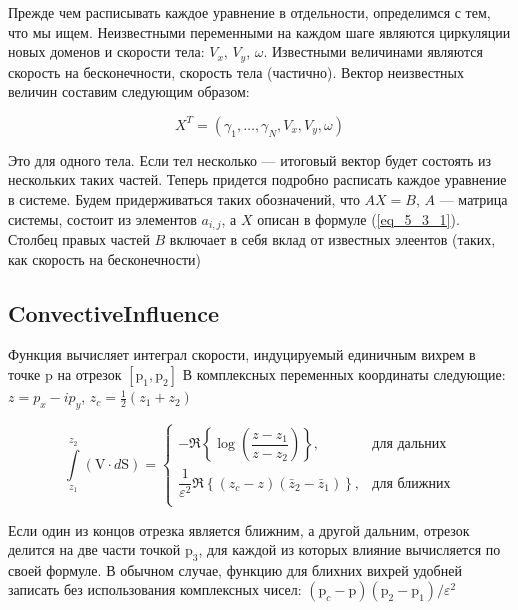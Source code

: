 \documentclass[14pt]{extreport}
\newcommand{\br}[1]{\boldsymbol{\mathrm{#1}}}
\begin{document}
Прежде чем расписывать каждое уравнение в отдельности, определимся с тем, что мы ищем. Неизвестными переменными на каждом шаге являются циркуляции новых доменов и скорости тела: $V_x$, $V_y$, $\omega$. Известными величинами являются скорость на бесконечности, скорость тела (частично). Вектор неизвестных величин составим следующим образом:

\begin{equation}
\label{eq_5_3_1}
X^T = (\gamma_1, \ldots, \gamma_N, V_x, V_y, \omega)
\end{equation}

Это для одного тела. Если тел несколько --- итоговый вектор будет состоять из нескольких таких частей. Теперь придется подробно расписать каждое уравнение в системе. Будем придерживаться таких обозначений, что $AX = B$, $A$ --- матрица системы, состоит из элементов $a_{i,j}$, а $X$ описан в формуле (\ref{eq_5_3_1}). Столбец правых частей $B$ включает в себя вклад от известных элеентов (таких, как скорость на бесконечности)


\subsection{ConvectiveInfluence}
Функция вычисляет интеграл скорости, индуцируемый единичным вихрем 
в точке $\br p$ на отрезок $[\br p_1, \br p_2]$
В комплексных переменных координаты следующие:
$z = p_x - i p_y$, $z_c = \frac{1}{2}(z_1 + z_2)$


\begin{equation*}
\int\limits_{z_1}^{z_2} \left (\br V \cdot d \br S \right ) = 
\begin{cases}
-\Re \left\lbrace \log \left(\dfrac{z-z_1}{z-z_2}\right) \right\rbrace,	&\text{для дальних}\\
\dfrac{1}{\varepsilon^2}\Re \left\lbrace (z_c-z)(\bar z_2 - \bar z_1) \right\rbrace, 	&\text{для ближних}\\
\end{cases}
\end{equation*}
\begin{center}\end{center}

Если один из концов отрезка является ближним, а другой дальним, 
отрезок делится на две части точкой $\br p_3$, для каждой
из которых влияние вычисляется по своей формуле.
В обычном случае, функцию для блихних вихрей удобней записать без использования
комплексных чисел:
$(\br p_c - \br p)(\br p_2 - \br p_1 ) / \varepsilon^2$
\end{document}

